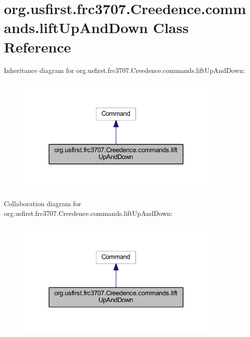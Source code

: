 \hypertarget{classorg_1_1usfirst_1_1frc3707_1_1_creedence_1_1commands_1_1lift_up_and_down}{}\section{org.\+usfirst.\+frc3707.\+Creedence.\+commands.\+lift\+Up\+And\+Down Class Reference}
\label{classorg_1_1usfirst_1_1frc3707_1_1_creedence_1_1commands_1_1lift_up_and_down}


Inheritance diagram for org.\+usfirst.\+frc3707.\+Creedence.\+commands.\+lift\+Up\+And\+Down\+:
\nopagebreak
\begin{figure}[H]
\begin{center}
\leavevmode
\includegraphics[width=287pt]{classorg_1_1usfirst_1_1frc3707_1_1_creedence_1_1commands_1_1lift_up_and_down__inherit__graph}
\end{center}
\end{figure}


Collaboration diagram for org.\+usfirst.\+frc3707.\+Creedence.\+commands.\+lift\+Up\+And\+Down\+:
\nopagebreak
\begin{figure}[H]
\begin{center}
\leavevmode
\includegraphics[width=287pt]{classorg_1_1usfirst_1_1frc3707_1_1_creedence_1_1commands_1_1lift_up_and_down__coll__graph}
\end{center}
\end{figure}

